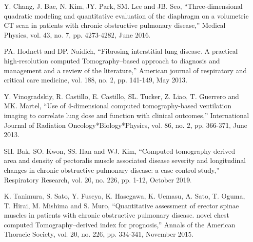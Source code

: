 \begin{thebibliography}{9}

 Y. Chang, J. Bae, N. Kim, JY. Park, SM. Lee and JB. Seo, “Three‐dimensional quadratic modeling and
quantitative evaluation of the diaphragm on a volumetric CT scan in patients with chronic obstructive pulmonary
disease,” Medical Physics, vol. 43, no. 7, pp. 4273-4282, June 2016.

 PA. Hodnett and DP. Naidich, “Fibrosing interstitial lung disease. A practical high-resolution computed
Tomography–based approach to diagnosis and management and a review of the literature,” American journal of respiratory
and critical care medicine, vol. 188, no. 2, pp. 141-149, May 2013.

 Y. Vinogradskiy, R. Castillo, E. Castillo, SL. Tucker, Z. Liao, T. Guerrero and MK. Martel, “Use of
4-dimensional computed tomography-based ventilation imaging to correlate lung dose and function with clinical outcomes,”
International Journal of Radiation Oncology*Biology*Physics, vol. 86, no. 2, pp. 366-371, June 2013.

 SH. Bak, SO. Kwon, SS. Han and WJ. Kim, “Computed tomography-derived area and density of pectoralis
muscle associated disease severity and longitudinal changes in chronic obstructive pulmonary disease: a case control
study,” Respiratory Research, vol. 20, no. 226, pp. 1-12, October 2019.

 K. Tanimura, S. Sato, Y. Fuseya, K. Hasegawa, K. Uemasu, A. Sato, T. Oguma, T. Hirai, M. Mishima and
S. Muro, “Quantitative assessment of erector spinae muscles in patients with chronic obstructive pulmonary disease.
novel chest computed Tomography–derived index for prognosis,” Annals of the American Thoracic Society, vol. 20, no. 226,
pp. 334-341, November 2015.

\end{thebibliography}
